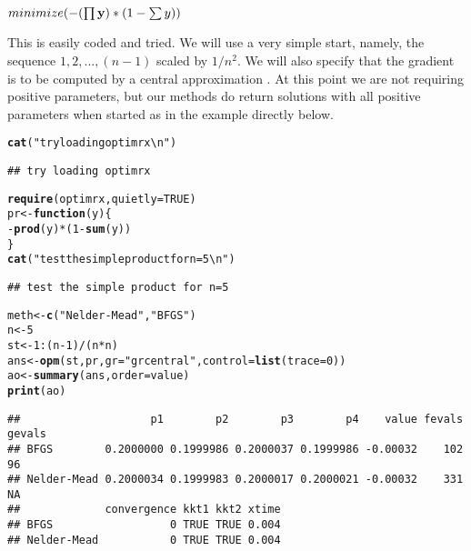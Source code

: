 \documentclass[11pt]{article}\usepackage[]{graphicx}\usepackage[]{color}
\makeatletter
\newcommand{\hlnum}[1]{\textcolor[rgb]{0.686,0.059,0.569}{#1}}%
\newcommand{\hlstr}[1]{\textcolor[rgb]{0.192,0.494,0.8}{#1}}%
\newcommand{\hlopt}[1]{\textcolor[rgb]{0,0,0}{#1}}%
\newcommand{\hlstd}[1]{\textcolor[rgb]{0.345,0.345,0.345}{#1}}%
\newcommand{\hlkwa}[1]{\textcolor[rgb]{0.161,0.373,0.58}{\textbf{#1}}}%
\newcommand{\hlkwb}[1]{\textcolor[rgb]{0.69,0.353,0.396}{#1}}%
\newcommand{\hlkwc}[1]{\textcolor[rgb]{0.333,0.667,0.333}{#1}}%
\newcommand{\hlkwd}[1]{\textcolor[rgb]{0.737,0.353,0.396}{\textbf{#1}}}%
\newenvironment{kframe}{%
 \def\at@end@of@kframe{}%
 \ifinner\ifhmode%
  \def\at@end@of@kframe{\end{minipage}}%
  \begin{minipage}{\columnwidth}%
 \fi\fi%
 \def\FrameCommand##1{\hskip\@totalleftmargin \hskip-\fboxsep
 \colorbox{shadecolor}{##1}\hskip-\fboxsep
     \hskip-\linewidth \hskip-\@totalleftmargin \hskip\columnwidth}%
 \MakeFramed {\advance\hsize-\width
   \@totalleftmargin\z@ \linewidth\hsize
   \@setminipage}}%
 {\par\unskip\endMakeFramed%
 \at@end@of@kframe}
\newenvironment{knitrout}{}{} %
\newcommand{\B}[1]{{\bf #1 \rm}}
\makeatother
\begin{document}
$ minimize ( - (\prod{\B{y}}) * (1 - \sum{y} ) ) $

\vspace*{10pt}
This is easily coded and tried. We will use a very simple start, namely, the sequence $1,2, ...,
(n-1)$ scaled by $1/n^2$. We will also specify that the gradient is to be computed by a 
central approximation \citep{optextras}. At this point we are not requiring positive
parameters, but our methods do return solutions with all positive parameters when started
as in the example directly below.

\begin{knitrout}\scriptsize
{}\color{fgcolor}\begin{kframe}
\begin{alltt}
\hlkwd{cat}\hlstd{(}\hlstr{"try loading optimrx\textbackslash{}n"}\hlstd{)}
\end{alltt}
\begin{verbatim}
## try loading optimrx
\end{verbatim}
\begin{alltt}
\hlkwd{require}\hlstd{(optimrx,} \hlkwc{quietly}\hlstd{=}\hlnum{TRUE}\hlstd{)}
\hlstd{pr} \hlkwb{<-} \hlkwa{function}\hlstd{(}\hlkwc{y}\hlstd{) \{}
\hlopt{-} \hlkwd{prod}\hlstd{(y)}\hlopt{*}\hlstd{(}\hlnum{1}\hlopt{-}\hlkwd{sum}\hlstd{(y))}
\hlstd{\}}
\hlkwd{cat}\hlstd{(}\hlstr{"test the simple product for n=5\textbackslash{}n"}\hlstd{)}
\end{alltt}
\begin{verbatim}
## test the simple product for n=5
\end{verbatim}
\begin{alltt}
\hlstd{meth} \hlkwb{<-} \hlkwd{c}\hlstd{(}\hlstr{"Nelder-Mead"}\hlstd{,} \hlstr{"BFGS"}\hlstd{)}
\hlstd{n}\hlkwb{<-}\hlnum{5}
  \hlstd{st}\hlkwb{<-}\hlnum{1}\hlopt{:}\hlstd{(n}\hlopt{-}\hlnum{1}\hlstd{)}\hlopt{/}\hlstd{(n}\hlopt{*}\hlstd{n)}
   \hlstd{ans}\hlkwb{<-}\hlkwd{opm}\hlstd{(st, pr,} \hlkwc{gr}\hlstd{=}\hlstr{"grcentral"}\hlstd{,} \hlkwc{control}\hlstd{=}\hlkwd{list}\hlstd{(}\hlkwc{trace}\hlstd{=}\hlnum{0}\hlstd{))}
   \hlstd{ao}\hlkwb{<-}\hlkwd{summary}\hlstd{(ans,}\hlkwc{order}\hlstd{=value)}
\hlkwd{print}\hlstd{(ao)}
\end{alltt}
\begin{verbatim}
##                    p1        p2        p3        p4    value fevals gevals
## BFGS        0.2000000 0.1999986 0.2000037 0.1999986 -0.00032    102     96
## Nelder-Mead 0.2000034 0.1999983 0.2000017 0.2000021 -0.00032    331     NA
##             convergence kkt1 kkt2 xtime
## BFGS                  0 TRUE TRUE 0.004
## Nelder-Mead           0 TRUE TRUE 0.004
\end{verbatim}
\end{kframe}
\end{knitrout}
\end{document}
